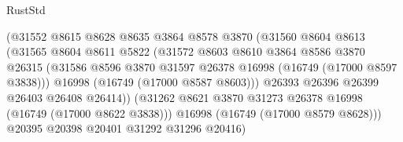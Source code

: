 \begin{lexlean}{RustStd}
\begin{coremodule}
                                      (@31552
                                        @8615
                                        @8628
                                        @8635
                                        @3864
                                        @8578
                                        @3870
                                        (@31560
                                          @8604
                                          @8613
                                          (@31565
                                            @8604
                                            @8611
                                            @5822
                                            (@31572
                                              @8603
                                              @8610
                                              @3864
                                              @8586
                                              @3870
                                              @26315
                                              (@31586
                                                @8596
                                                @3870
                                                @31597
                                                @26378
                                                @16998
                                                (@16749 (@17000 @8597 @3838)))
                                              @16998
                                              (@16749 (@17000 @8587 @8603)))
                                            @26393
                                            @26396
                                            @26399
                                            @26403
                                            @26408
                                            @26414))
                                        (@31262
                                          @8621
                                          @3870
                                          @31273
                                          @26378
                                          @16998
                                          (@16749 (@17000 @8622 @3838)))
                                        @16998
                                        (@16749 (@17000 @8579 @8628)))
                                      @20395
                                      @20398
                                      @20401
                                      @31292
                                      @31296
                                      @20416)

\end{coremodule}
\end{lexlean}
